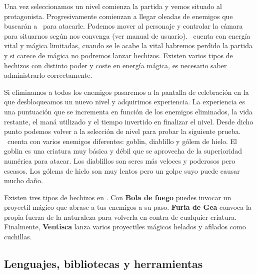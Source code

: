 \documentclass[a4paper,11pt]{article}
\begin{document}

\noindent Una vez seleccionamos un nivel comienza la partida y vemos situado al protagonista.
Progresivamente comienzan a llegar oleadas de enemigos que buscarán a \prota\
para atacarle. Podemos mover al personaje y controlar la cámara para situarnos
según nos convenga (ver manual de usuario). \prota\ cuenta con energía vital
y mágica limitadas, cuando se le acabe la vital habremos perdido la partida
y si carece de mágica no podremos lanzar hechizos. Existen varios tipos de hechizos
con distinto poder y coste en energía mágica, es necesario saber administrarlo correctamente.


\noindent Si eliminamos a todos los enemigos pasaremos a la pantalla de celebración
en la que desbloqueamos un nuevo nivel y adquirimos experiencia. La experiencia
es una puntuación que se incrementa en función de los enemigos eliminados,
la vida restante, el maná utilizado y el tiempo invertido en finalizar el nivel.
Desde dicho punto podemos volver a la selección de nivel para probar la
siguiente prueba.\\


\noindent \juego\ cuenta con varios enemigos diferentes: goblin, diablillo
y gólem de hielo. El goblin es una criatura muy básica y débil que se aprovecha
de la superioridad numérica para atacar. Los diablillos son seres más veloces
y poderosos pero escasos. Los gólems de hielo son muy lentos pero un golpe
suyo puede causar mucho daño.\\



\noindent Existen tres tipos de hechizos en \juego. Con \textbf{Bola de fuego} puedes
invocar un proyectil mágico que abrase a tus enemigos a su paso. 
\textbf{Furia de Gea} convoca la propia fuerza de la naturaleza para volverla
en contra de cualquier criatura. Finalmente, \textbf{Ventisca} lanza varios
proyectiles mágicos helados y afilados como cuchillas.\\

\subsection{Lenguajes, bibliotecas y herramientas}
\end{document}
